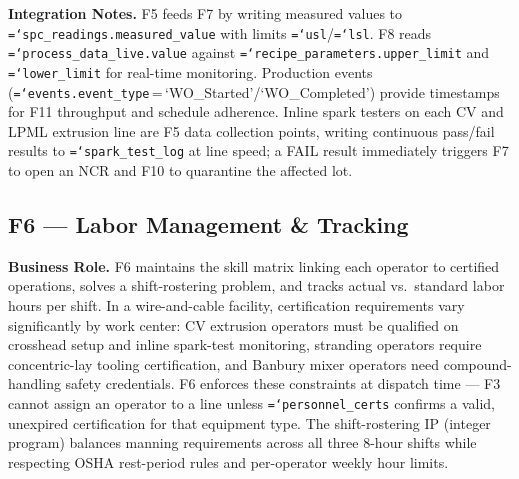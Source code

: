 \documentclass[11pt]{article}
\newcommand{\tfield}[1]{\texttt{\hyphenchar\font=`\-\relax #1}}
\begin{document}
\textbf{Integration Notes.}
F5 feeds F7 by writing measured values to \tfield{spc\_readings.\allowbreak measured\_value} with limits \tfield{usl}/\tfield{lsl}.
F8 reads \tfield{process\_data\_live.\allowbreak value} against \tfield{recipe\_parameters.\allowbreak upper\_limit} and \tfield{lower\_limit} for real-time monitoring.
Production events (\tfield{events.\allowbreak event\_type}\,=\,`WO\_Started'/`WO\_Completed') provide timestamps for F11 throughput and schedule adherence.
Inline spark testers on each CV and LPML extrusion line are F5 data collection points, writing continuous pass/fail results to \tfield{spark\_test\_log} at line speed; a FAIL result immediately triggers F7 to open an NCR and F10 to quarantine the affected lot.

\subsection{F6 --- Labor Management \& Tracking}

\textbf{Business Role.}
F6 maintains the skill matrix linking each operator to certified operations, solves a shift-rostering problem, and tracks actual vs.\ standard labor hours per shift.  In a wire-and-cable facility, certification requirements vary significantly by work center: CV extrusion operators must be qualified on crosshead setup and inline spark-test monitoring, stranding operators require concentric-lay tooling certification, and Banbury mixer operators need compound-handling safety credentials.  F6 enforces these constraints at dispatch time --- F3 cannot assign an operator to a line unless \tfield{personnel\_certs} confirms a valid, unexpired certification for that equipment type.  The shift-rostering IP (integer program) balances manning requirements across all three 8-hour shifts while respecting OSHA rest-period rules and per-operator weekly hour limits.
\end{document}

